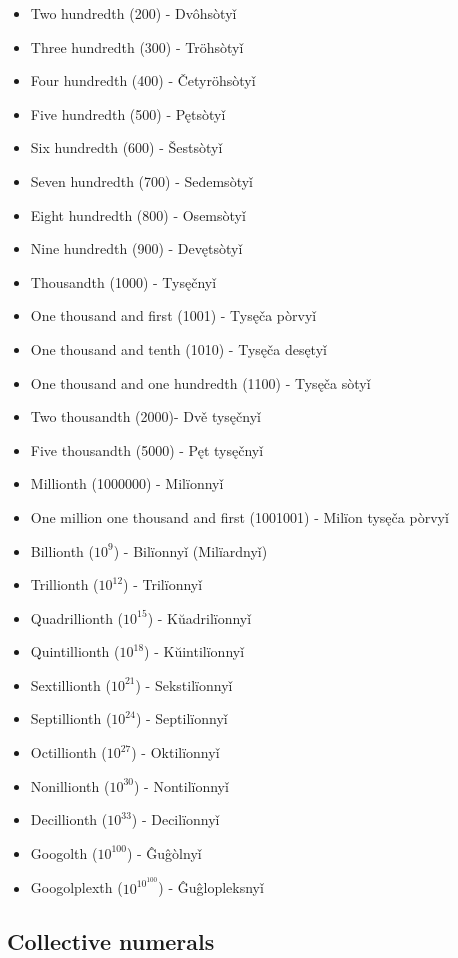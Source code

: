 \begin{itemize}
	\item Two hundredth (200) - Dvôhsòtyǐ
	\item Three hundredth (300) - Tröhsòtyǐ
	\item Four hundredth (400) - Četyröhsòtyǐ
	\item Five hundredth (500) - Pętsòtyǐ
	\item Six hundredth (600) - Šestsòtyǐ
	\item Seven hundredth (700) - Sedemsòtyǐ
	\item Eight hundredth (800) - Osemsòtyǐ
	\item Nine hundredth (900) - Devętsòtyǐ
	\item Thousandth (1000) - Tysęčnyǐ
	\item One thousand and first (1001) - Tysęča pòrvyǐ
	\item One thousand and tenth (1010) - Tysęča desętyǐ
	\item One thousand and one hundredth (1100) - Tysęča sòtyǐ
	\item Two thousandth (2000)- Dvě tysęčnyǐ
	\item Five thousandth (5000) - Pęt tysęčnyǐ
	\item Millionth (1000000) - Milïonnyǐ
	\item One million one thousand and first (1001001) - Milïon tysęča pòrvyǐ
	\item Billionth ($10^9$) - Bilïonnyǐ (Milïardnyǐ)
	\item Trillionth ($10^{12}$) - Trilïonnyǐ
	\item Quadrillionth ($10^{15}$) - Kŭadrilïonnyǐ
	\item Quintillionth ($10^{18}$) - Kŭintilïonnyǐ
	\item Sextillionth ($10^{21}$) - Sekstilïonnyǐ
	\item Septillionth ($10^{24}$) - Septilïonnyǐ
	\item Octillionth ($10^{27}$) - Oktilïonnyǐ
	\item Nonillionth ($10^{30}$) - Nontilïonnyǐ
	\item Decillionth ($10^{33}$) - Decilïonnyǐ
	\item Googolth ($10^{100}$) - Ĝuĝòlnyǐ
	\item Googolplexth ($10^{10^{100}}$) - Ĝuĝlopleksnyǐ
\end{itemize}

\subsection{Collective numerals}

